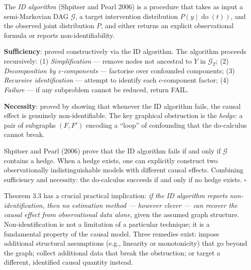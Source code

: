 \documentclass[
  a4paper,
]{book}
\newcommand{\doop}{\operatorname{do}}
\newcommand{\Gcal}{\mathcal{G}}
\begin{document}
\begin{tcolorbox}[enhanced jigsaw, arc=.35mm, bottomrule=.15mm, bottomtitle=1mm, breakable, colback=white, colbacktitle=quarto-callout-note-color!10!white, colframe=quarto-callout-note-color-frame, coltitle=black, left=2mm, leftrule=.75mm, opacityback=0, opacitybacktitle=0.6, rightrule=.15mm, title={Proof Sketch and the ID Algorithm}, titlerule=0mm, toprule=.15mm, toptitle=1mm]

The \emph{ID algorithm} (Shpitser and Pearl 2006) is a procedure that
takes as input a semi-Markovian DAG \(\Gcal\), a target intervention
distribution \(P(y \mid \doop(t))\), and the observed joint distribution
\(P\), and either returns an explicit observational formula or reports
non-identifiability.

\textbf{Sufficiency}: proved constructively via the ID algorithm. The
algorithm proceeds recursively: (1) \emph{Simplification} --- remove
nodes not ancestral to \(Y\) in \(\Gcal_{\overline{T}}\); (2)
\emph{Decomposition by c-components} --- factorise over confounded
components; (3) \emph{Recursive identification} --- attempt to identify
each c-component factor; (4) \emph{Failure} --- if any subproblem cannot
be reduced, return FAIL.

\textbf{Necessity}: proved by showing that whenever the ID algorithm
fails, the causal effect is genuinely non-identifiable. The key
graphical obstruction is the \emph{hedge}: a pair of subgraphs
\((F, F')\) encoding a ``loop'' of confounding that the do-calculus
cannot break.

Shpitser and Pearl (2006) prove that the ID algorithm fails if and only
if \(\Gcal\) contains a hedge. When a hedge exists, one can explicitly
construct two observationally indistinguishable models with different
causal effects. Combining sufficiency and necessity: the do-calculus
succeeds if and only if no hedge exists. \(\square\)

\end{tcolorbox}

\begin{tcolorbox}[enhanced jigsaw, arc=.35mm, bottomrule=.15mm, bottomtitle=1mm, breakable, colback=white, colbacktitle=quarto-callout-note-color!10!white, colframe=quarto-callout-note-color-frame, coltitle=black, left=2mm, leftrule=.75mm, opacityback=0, opacitybacktitle=0.6, rightrule=.15mm, title={Remark: Practical Implication of Completeness}, titlerule=0mm, toprule=.15mm, toptitle=1mm]

Theorem 3.3 has a crucial practical implication: \emph{if the ID
algorithm reports non-identification, then no estimation method ---
however clever --- can recover the causal effect from observational data
alone}, given the assumed graph structure. Non-identification is not a
limitation of a particular technique; it is a fundamental property of
the causal model. Three remedies exist: impose additional structural
assumptions (e.g., linearity or monotonicity) that go beyond the graph;
collect additional data that break the obstruction; or target a
different, identified causal quantity instead.

\end{tcolorbox}
\end{document}
